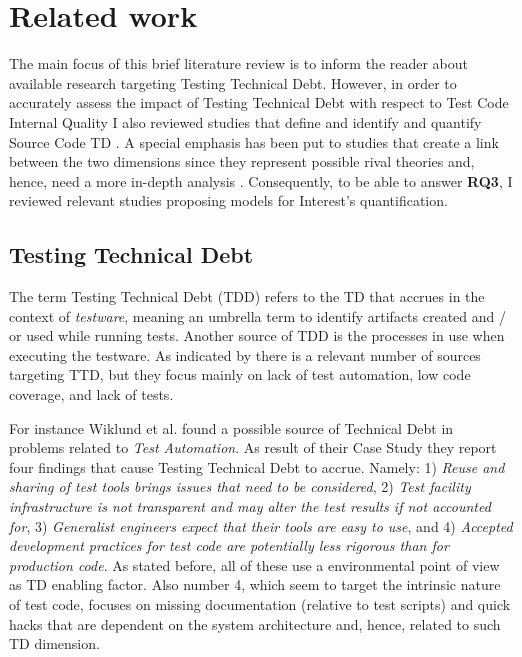 \chapter{Related work} \label{related_work}

The main focus of this brief literature review is to inform the reader about available research targeting Testing Technical Debt. However, in order to accurately assess the impact of Testing Technical Debt with respect to Test Code Internal Quality I also reviewed studies that define and identify and quantify Source Code TD \cite{mapping_study_td}. A special emphasis has been put to studies that create a link between the two dimensions since they represent possible rival theories and, hence, need a more in-depth analysis \cite{case_study_guide}. Consequently, to be able to answer \textbf{RQ3}, I reviewed relevant studies proposing models for Interest's quantification.

\section{Testing Technical Debt} \label{testing_td}

The term Testing Technical Debt (TDD) refers to the TD that accrues in the context of \textit{testware}, meaning an umbrella term to identify artifacts created and / or used while running tests. Another source of TDD is the processes in use when executing the testware. As indicated by \cite{mapping_study_td, exploration_of_td, exploration_of_td2} there is a relevant number of sources targeting TTD, but they focus mainly on lack of test automation, low code coverage, and lack of tests.

For instance Wiklund et al. \cite{test_automation_td} found a possible source of Technical Debt in problems related to \textit{Test Automation}. As result of their Case Study they report four findings that cause Testing Technical Debt to accrue. Namely: 1) \textit{Reuse and sharing of test tools brings issues that need to be considered}, 2) \textit{Test facility infrastructure is not transparent and may alter the test results if not accounted for}, 3) \textit{Generalist engineers expect that their tools are easy to use}, and 4) \textit{Accepted development practices for test code are potentially less rigorous than for production code}. As stated before, all of these use a environmental point of view as TD enabling factor. Also number 4, which seem to target the intrinsic nature of test code, focuses on missing documentation (relative to test scripts) and quick hacks that are dependent on the system architecture and, hence, related to such TD dimension. 

